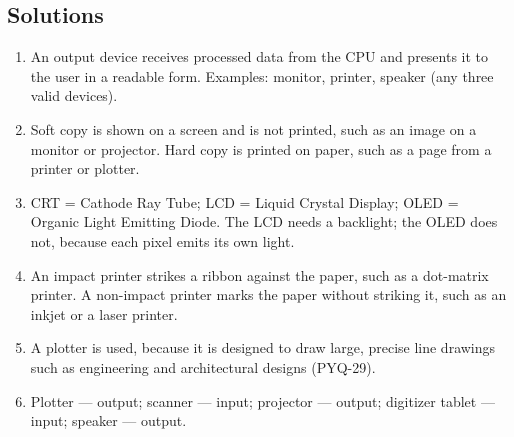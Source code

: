\documentclass[11pt]{article}
\begin{document}
\subsection*{Solutions}
\begingroup\small
\begin{enumerate}[label=\arabic*.]
  \item An output device receives processed data from the CPU and presents it
    to the user in a readable form. Examples: monitor, printer, speaker (any
    three valid devices).
  \item Soft copy is shown on a screen and is not printed, such as an image on
    a monitor or projector. Hard copy is printed on paper, such as a page from
    a printer or plotter.
  \item CRT = Cathode Ray Tube; LCD = Liquid Crystal Display; OLED = Organic
    Light Emitting Diode. The LCD needs a backlight; the OLED does not,
    because each pixel emits its own light.
  \item An impact printer strikes a ribbon against the paper, such as a
    dot-matrix printer. A non-impact printer marks the paper without striking
    it, such as an inkjet or a laser printer.
  \item A plotter is used, because it is designed to draw large, precise line
    drawings such as engineering and architectural designs (PYQ-29).
  \item Plotter --- output; scanner --- input; projector --- output; digitizer
    tablet --- input; speaker --- output.
\end{enumerate}
\endgroup
\end{document}
